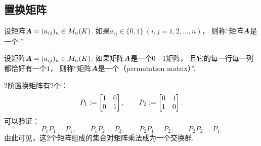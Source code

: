 \subsection{置换矩阵}
\begin{definition}
设矩阵\(\boldsymbol{A}=(a_{ij})_n \in M_n(K)\).
如果\(a_{ij} \in \{0,1\}\ (i,j=1,2,\dotsc,n)\)，
则称“矩阵\(\boldsymbol{A}\)是一个 ”.
\end{definition}
\begin{definition}
设矩阵\(\boldsymbol{A}=(a_{ij})_n \in M_n(K)\).
如果矩阵\(\boldsymbol{A}\)是一个0 - 1矩阵，
且它的每一行每一列都恰好有一个\(1\)，
则称“矩阵\(\boldsymbol{A}\)是一个（permutation matrix）”.
\end{definition}


\begin{example}
2阶置换矩阵有2个：\begin{equation*}
	P_1 := \begin{bmatrix}
		1 & 0 \\
		0 & 1
	\end{bmatrix},
	\qquad
	P_2 := \begin{bmatrix}
		0 & 1 \\
		1 & 0
	\end{bmatrix}.
\end{equation*}
可以验证：\begin{equation*}
	P_1 P_1 = P_1,
	\qquad
	P_1 P_2 = P_2,
	\qquad
	P_2 P_1 = P_2,
	\qquad
	P_2 P_2 = P_1.
\end{equation*}
由此可见，这2个矩阵组成的集合对矩阵乘法成为一个交换群.
\end{example}


